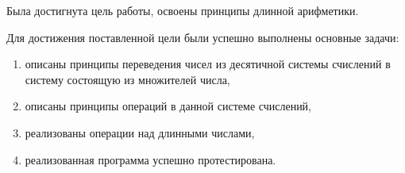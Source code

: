 
Была достигнута цель работы, освоены принципы длинной арифметики.

Для достижения поставленной цели были успешно выполнены основные задачи: 
\begin{enumerate}
	\item описаны принципы переведения чисел из десятичной системы счислений в систему состоящую из множителей числа, 
	\item описаны принципы операций в данной системе счислений,
	\item реализованы операции над длинными числами,
	\item реализованная программа успешно протестирована.
\end{enumerate}
